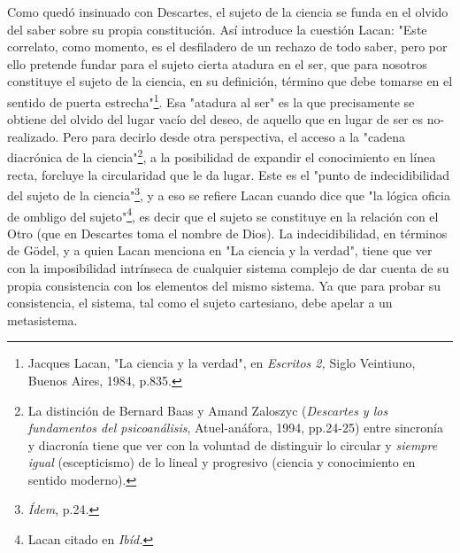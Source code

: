 \documentclass{book}
\begin{document}
Como quedó insinuado con Descartes, el sujeto de la ciencia se funda en
el olvido del saber sobre su propia constitución. Así introduce la
cuestión Lacan: "Este correlato, como momento, es el desfiladero de un
rechazo de todo saber, pero por ello pretende fundar para el sujeto
cierta atadura en el ser, que para nosotros constituye el sujeto de la
ciencia, en su definición, término que debe tomarse en el sentido de
puerta estrecha"\footnote{Jacques Lacan, "La ciencia y la verdad", en
  \emph{Escritos 2,} Siglo Veintiuno, Buenos Aires, 1984, p.835.}. Esa
"atadura al ser" es la que precisamente se obtiene del olvido del lugar
vacío del deseo, de aquello que en lugar de ser es no-realizado. Pero
para decirlo desde otra perspectiva, el acceso a la "cadena diacrónica
de la ciencia"\footnote{La distinción de Bernard Baas y Amand Zaloszyc
  (\emph{Descartes y los fundamentos del psicoanálisis}, Atuel-anáfora,
  1994, pp.24-25) entre sincronía y diacronía tiene que ver con la
  voluntad de distinguir lo circular y \emph{siempre igual}
  (escepticismo) de lo lineal y progresivo (ciencia y conocimiento en
  sentido moderno).}, a la posibilidad de expandir el conocimiento en
línea recta, forcluye la circularidad que le da lugar. Este es el "punto
de indecidibilidad del sujeto de la ciencia"\footnote{\emph{Ídem}, p.24.},
y a eso se refiere Lacan cuando dice que "la lógica oficia de ombligo
del sujeto"\footnote{Lacan citado en \emph{Ibíd.}}, es decir que el
sujeto se constituye en la relación con el Otro (que en Descartes toma
el nombre de Dios). La indecidibilidad, en términos de Gödel, y a quien
Lacan menciona en "La ciencia y la verdad", tiene que ver con la
imposibilidad intrínseca de cualquier sistema complejo de dar cuenta de
su propia consistencia con los elementos del mismo sistema. Ya que para
probar su consistencia, el sistema, tal como el sujeto cartesiano, debe
apelar a un metasistema.
\end{document}
